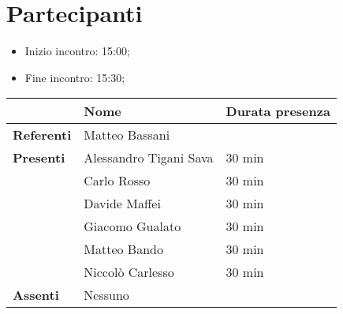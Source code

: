 \section{Partecipanti}

\begin{itemize}
    \item Inizio incontro: 15:00;
    \item Fine incontro: 15:30;
\end{itemize}


\begin{center}
{\renewcommand{\arraystretch}{1.5}
\begin{tabular}{l|ll}
	                    & \textbf{Nome}  & \textbf{Durata presenza} 	\\
	\hline
	\textbf{Referenti} 	& Matteo Bassani & 								\\
	
	\hline
	\textbf{Presenti}   & Alessandro Tigani Sava	& 30 min  \\  
						& Carlo Rosso            	& 30 min  \\  
						& Davide Maffei          	& 30 min  \\  
  						& Giacomo Gualato        	& 30 min  \\  
						& Matteo Bando           	& 30 min  \\  
						& Niccolò Carlesso       	& 30 min  \\  
	\hline
	\textbf{Assenti}	& 	     Nessuno    		&	      \\
\end{tabular}	
}
\end{center}